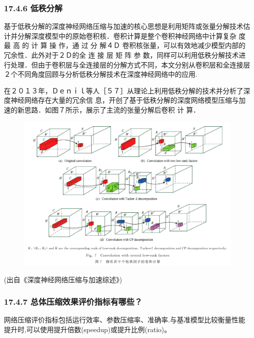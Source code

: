 \subsubsection{17.4.6 低秩分解}\label{ux4f4eux79e9ux5206ux89e3}

基于低秩分解的深度神经网络压缩与加速的核心思想是利用矩阵或张量分解技术估计并分解深度模型中的原始卷积核．卷积计算是整个卷积神经网络中计算复杂
度 最 高 的 计 算 操 作，通 过 分 解４Ｄ
卷积核张量，可以有效地减少模型内部的冗余性．此外对于２Ｄ的全 连 接 层 矩
阵 参
数，同样可以利用低秩分解技术进行处理．但由于卷积层与全连接层的分解方式不同，本文分别从卷积层和全连接层２个不同角度回顾与分析低秩分解技术在深度神经网络中的应用.

在２０１３年，Ｄｅｎｉｌ等人［５７］从理论上利用低秩分解的技术并分析了深度神经网络存在大量的冗余信
息，开创了基于低秩分解的深度网络模型压缩与加速的新思路．如图７所示，展示了主流的张量分解后卷积
计 算．

\begin{figure}
\centering
\includegraphics{./img/ch17/低秩分解模型压缩加速.jpg}
\caption{}
\end{figure}

(出自《深度神经网络压缩与加速综述》)

\subsubsection{17.4.7
总体压缩效果评价指标有哪些？}\label{ux603bux4f53ux538bux7f29ux6548ux679cux8bc4ux4ef7ux6307ux6807ux6709ux54eaux4e9b}

​
网络压缩评价指标包括运行效率、参数压缩率、准确率.与基准模型比较衡量性能提升时,可以使用提升倍数(speedup)或提升比例(ratio)。

